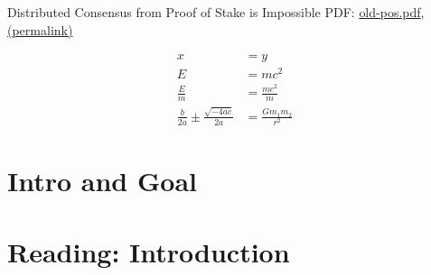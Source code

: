 \documentclass{article}
\begin{document}
Distributed Consensus from Proof of Stake is Impossible PDF: \href{../../files/pdfs/2014-05-28-distributed-consensus-pos/old-pos.pdf}{old-pos.pdf}, \href{https://xertrov.github.io/fi/files/pdfs/2014-05-28-distributed-consensus-pos/old-pos.pdf}{(permalink)}

\begin{align}
x & = y \\
E & = {mc^2} \\
\frac{E}{m} & = \frac{mc^2}{m} \\
\frac{b}{2a} \pm \frac{\sqrt{-4ac}}{2a} & = \frac{Gm_1m_2}{r^2}
\end{align}

\tableofcontents

\section{Intro and Goal}

\section{Reading: Introduction}
\end{document}
